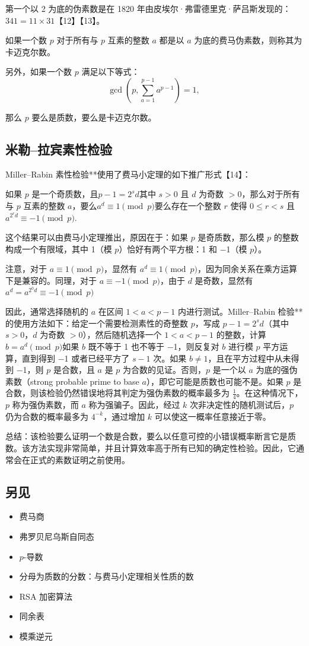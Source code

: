 第一个以 2 为底的伪素数是在 1820 年由皮埃尔·弗雷德里克·萨吕斯发现的：$341 = 11 \times 31$【12】【13】。  

如果一个数 \( p \) 对于所有与 \( p \) 互素的整数 \( a \) 都是以 \( a \) 为底的费马伪素数，则称其为卡迈克尔数。  

另外，如果一个数 \( p \) 满足以下等式：  
$$
\gcd\left(p, \sum_{a=1}^{p-1} a^{p-1}\right) = 1,~
$$

那么 $p$ 要么是质数，要么是卡迈克尔数。
\subsection{米勒–拉宾素性检验}

Miller–Rabin 素性检验**使用了费马小定理的如下推广形式【14】：

如果 $p$ 是一个奇质数，且$p - 1 = 2^s d$其中 $s > 0$ 且 $d$ 为奇数 $>0$，那么对于所有与 $p$ 互素的整数 $a$，要么$a^d \equiv 1 \pmod{p}$要么存在一个整数 $r$ 使得 $0 \le r < s$ 且$a^{2^r d} \equiv -1 \pmod{p}$.

这个结果可以由费马小定理推出，原因在于：如果 $p$ 是奇质数，那么模 $p$ 的整数构成一个有限域，其中 1（模 $p$）恰好有两个平方根：1 和 −1（模 $p$）。

注意，对于 $a \equiv 1 \pmod{p}$，显然有 $a^d \equiv 1 \pmod{p}$，因为同余关系在乘方运算下是兼容的。同理，对于 $a \equiv -1 \pmod{p}$，由于 $d$ 是奇数，显然有$a^d = a^{2^0 d} \equiv -1 \pmod{p}$

因此，通常选择随机的 $a$ 在区间 $1 < a < p - 1$ 内进行测试。Miller–Rabin 检验**的使用方法如下：给定一个需要检测素性的奇整数 $p$，写成 $p - 1 = 2^s d$（其中 $s > 0$，$d$ 为奇数 $> 0$），然后随机选择一个 $1 < a < p - 1$ 的整数，计算$b = a^d \pmod{p}$如果 $b$ 既不等于 1 也不等于 −1，则反复对 $b$ 进行模 $p$ 平方运算，直到得到 −1 或者已经平方了 $s - 1$ 次。如果 $b \neq 1$，且在平方过程中从未得到 −1，则 $p$ 是合数，且 $a$ 是 $p$ 为合数的见证。否则，$p$ 是一个以 $a$ 为底的强伪素数（strong probable prime to base $a$），即它可能是质数也可能不是。如果 $p$ 是合数，则该检验仍然错误地将其判定为强伪素数的概率最多为 $\frac14$。在这种情况下，$p$ 称为强伪素数，而 $a$ 称为强骗子。因此，经过 $k$ 次非决定性的随机测试后，$p$ 仍为合数的概率最多为 $4^{-k}$，通过增加 $k$ 可以使这一概率任意接近于零。

总结：该检验要么证明一个数是合数，要么以任意可控的小错误概率断言它是质数。该方法实现非常简单，并且计算效率高于所有已知的确定性检验。因此，它通常会在正式的素数证明之前使用。
\subsection{另见}
\begin{itemize}
\item 费马商
\item 弗罗贝尼乌斯自同态
\item $p$-导数
\item 分母为质数的分数：与费马小定理相关性质的数
\item RSA 加密算法
\item 同余表
\item 模乘逆元
\end{itemize}
